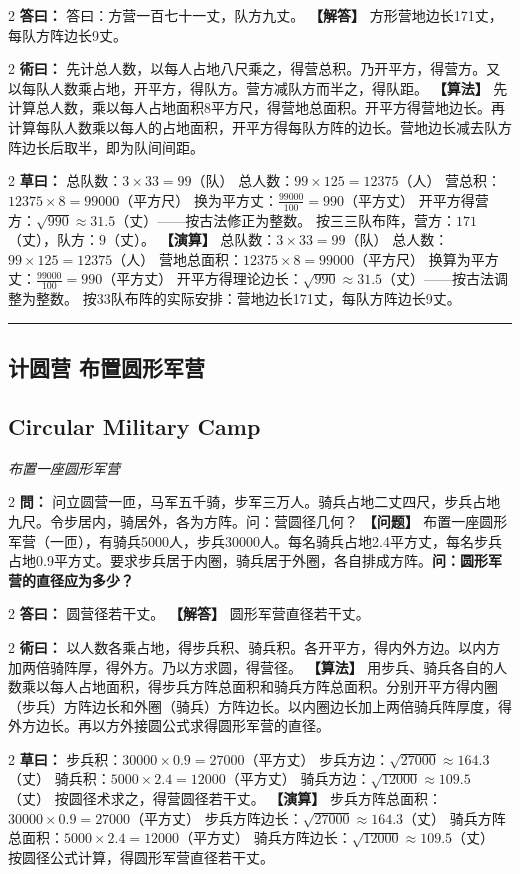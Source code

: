 \documentclass[11pt,a4paper]{article}
\newcommand{\longline}{\noindent\rule{\textwidth}{0.4pt}}
\newcommand{\bilingualProblem}[2]{%
  \vspace{0.6em}%
  \begin{paracol}{2}%
  \noindent\textcolor{problemcolor}{\textbf{問：}}#1%
  \switchcolumn%
  \noindent\textcolor{problemcolor}{\textbf{【问题】}}#2%
  \end{paracol}%
  \vspace{0.3em}%
}
\newcommand{\bilingualAnswer}[2]{%
  \begin{paracol}{2}%
  \noindent\textcolor{answercolor}{\textbf{答曰：}}#1%
  \switchcolumn%
  \noindent\textcolor{answercolor}{\textbf{【解答】}}#2%
  \end{paracol}%
  \vspace{0.3em}%
}
\newcommand{\bilingualMethod}[2]{%
  \begin{paracol}{2}%
  \noindent\textcolor{methodcolor}{\textbf{術曰：}}#1%
  \switchcolumn%
  \noindent\textcolor{methodcolor}{\textbf{【算法】}}#2%
  \end{paracol}%
  \vspace{0.3em}%
}
\newcommand{\bilingualWorking}[2]{%
  \begin{paracol}{2}%
  \noindent\textcolor{workingcolor}{\textbf{草曰：}}#1%
  \switchcolumn%
  \noindent\textcolor{workingcolor}{\textbf{【演算】}}#2%
  \end{paracol}%
  \vspace{0.3em}%
}
\newcommand{\bilingualSubsection}[2]{%
  \subsection{#1}
  \begin{center}
  {\small\color{sectioncolor}\textit{#2}}
  \end{center}
  \vspace{0.3em}
}
\begin{document}
\bilingualAnswer{%
答曰：方营一百七十一丈，队方九丈。%
}{%
方形营地边长171丈，每队方阵边长9丈。%
}

\bilingualMethod{%
先计总人数，以每人占地八尺乘之，得营总积。乃开平方，得营方。又以每队人数乘占地，开平方，得队方。营方减队方而半之，得队距。%
}{%
先计算总人数，乘以每人占地面积8平方尺，得营地总面积。开平方得营地边长。再计算每队人数乘以每人的占地面积，开平方得每队方阵的边长。营地边长减去队方阵边长后取半，即为队间间距。%
}

\bilingualWorking{%
总队数：$3 \times 33 = 99$（队）
总人数：$99 \times 125 = 12375$（人）
营总积：$12375 \times 8 = 99000$（平方尺）
换为平方丈：$\displaystyle\frac{99000}{100} = 990$（平方丈）
开平方得营方：$\sqrt{990} \approx 31.5$（丈）——按古法修正为整数。
按三三队布阵，营方：$171$（丈），队方：$9$（丈）。%
}{%
总队数：$3 \times 33 = 99$（队）
总人数：$99 \times 125 = 12375$（人）
营地总面积：$12375 \times 8 = 99000$（平方尺）
换算为平方丈：$\displaystyle\frac{99000}{100} = 990$（平方丈）
开平方得理论边长：$\sqrt{990} \approx 31.5$（丈）——按古法调整为整数。
按33队布阵的实际安排：营地边长171丈，每队方阵边长9丈。%
}

\vspace{0.5em}
\longline

\subsection{计圆营 \quad 布置圆形军营}
\bilingualSubsection{Circular Military Camp}{布置一座圆形军营}

\bilingualProblem{%
问立圆营一匝，马军五千骑，步军三万人。骑兵占地二丈四尺，步兵占地九尺。令步居内，骑居外，各为方阵。问：营圆径几何？%
}{%
布置一座圆形军营（一匝），有骑兵5000人，步兵30000人。每名骑兵占地2.4平方丈，每名步兵占地0.9平方丈。要求步兵居于内圈，骑兵居于外圈，各自排成方阵。\textbf{问：圆形军营的直径应为多少？}%
}

\bilingualAnswer{%
圆营径若干丈。%
}{%
圆形军营直径若干丈。%
}

\bilingualMethod{%
以人数各乘占地，得步兵积、骑兵积。各开平方，得内外方边。以内方加两倍骑阵厚，得外方。乃以方求圆，得营径。%
}{%
用步兵、骑兵各自的人数乘以每人占地面积，得步兵方阵总面积和骑兵方阵总面积。分别开平方得内圈（步兵）方阵边长和外圈（骑兵）方阵边长。以内圈边长加上两倍骑兵阵厚度，得外方边长。再以方外接圆公式求得圆形军营的直径。%
}

\bilingualWorking{%
步兵积：$30000 \times 0.9 = 27000$（平方丈）
步兵方边：$\sqrt{27000} \approx 164.3$（丈）
骑兵积：$5000 \times 2.4 = 12000$（平方丈）
骑兵方边：$\sqrt{12000} \approx 109.5$（丈）
按圆径术求之，得营圆径若干丈。%
}{%
步兵方阵总面积：$30000 \times 0.9 = 27000$（平方丈）
步兵方阵边长：$\sqrt{27000} \approx 164.3$（丈）
骑兵方阵总面积：$5000 \times 2.4 = 12000$（平方丈）
骑兵方阵边长：$\sqrt{12000} \approx 109.5$（丈）
按圆径公式计算，得圆形军营直径若干丈。%
}
\end{document}

